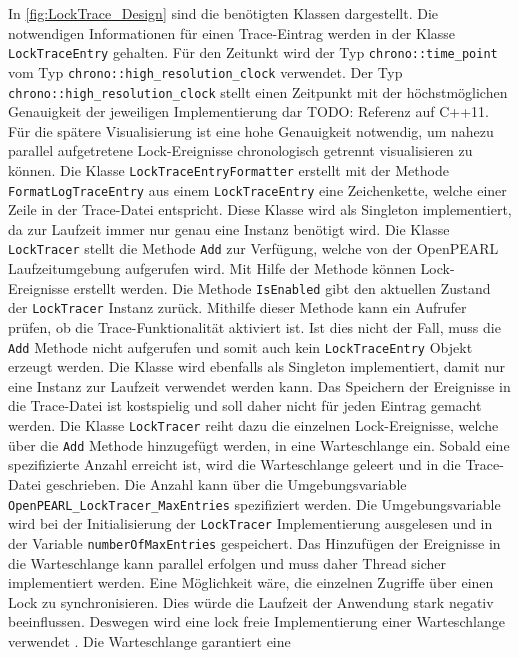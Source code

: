 In \cref{fig:LockTrace_Design} sind die benötigten Klassen dargestellt. Die
notwendigen Informationen für einen Trace-Eintrag werden in der Klasse
\texttt{LockTraceEntry} gehalten. Für den Zeitunkt wird der Typ 
\texttt{chrono::time\_point} vom Typ \texttt{chrono::high\_resolution\_clock}
verwendet. Der Typ \texttt{chrono::high\_resolution\_clock} stellt einen
Zeitpunkt mit der höchstmöglichen Genauigkeit der jeweiligen Implementierung dar
{TODO: Referenz auf C++11}. Für die spätere Visualisierung ist eine hohe
Genauigkeit notwendig, um nahezu parallel aufgetretene Lock-Ereignisse
chronologisch getrennt visualisieren zu können. Die Klasse
\texttt{LockTraceEntryFormatter} erstellt mit der Methode
\texttt{FormatLogTraceEntry} aus einem \texttt{LockTraceEntry} eine
Zeichenkette, welche einer Zeile in der Trace-Datei entspricht. Diese Klasse
wird als Singleton implementiert, da zur Laufzeit immer nur genau eine Instanz
benötigt wird. Die Klasse \texttt{LockTracer} stellt die Methode \texttt{Add}
zur Verfügung, welche von der OpenPEARL Laufzeitumgebung aufgerufen wird. Mit
Hilfe der Methode können Lock-Ereignisse erstellt werden. Die Methode
\texttt{IsEnabled} gibt den aktuellen Zustand der \texttt{LockTracer} Instanz
zurück. Mithilfe dieser Methode kann ein Aufrufer prüfen, ob die
Trace-Funktionalität aktiviert ist. Ist dies nicht der Fall, muss die
\texttt{Add} Methode nicht aufgerufen und somit auch kein
\texttt{LockTraceEntry} Objekt erzeugt werden. Die Klasse wird ebenfalls als
Singleton implementiert, damit nur eine Instanz zur Laufzeit verwendet werden
kann. Das Speichern der Ereignisse in die Trace-Datei ist kostspielig und soll
daher nicht für jeden Eintrag gemacht werden. Die Klasse \texttt{LockTracer}
reiht dazu die einzelnen Lock-Ereignisse, welche über die \texttt{Add} Methode
hinzugefügt werden, in eine Warteschlange ein. Sobald eine spezifizierte Anzahl
erreicht ist, wird die Warteschlange geleert und in die Trace-Datei geschrieben.
Die Anzahl kann über die Umgebungsvariable
\texttt{OpenPEARL\_LockTracer\_MaxEntries} spezifiziert werden. Die
Umgebungsvariable wird bei der Initialisierung der \texttt{LockTracer}
Implementierung ausgelesen und in der Variable \texttt{numberOfMaxEntries}
gespeichert. Das Hinzufügen der Ereignisse in die Warteschlange kann parallel
erfolgen und muss daher Thread sicher implementiert werden. Eine Möglichkeit
wäre, die einzelnen Zugriffe über einen Lock zu synchronisieren. Dies würde die
Laufzeit der Anwendung stark negativ beeinflussen. Deswegen wird eine lock freie
Implementierung einer Warteschlange verwendet
\autocite{Moody_Camels_Concurrentqueue}. Die Warteschlange garantiert eine
